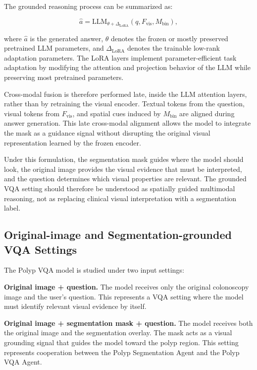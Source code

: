 The grounded reasoning process can be summarized as:

\begin{equation}
\hat{a} = \mathrm{LLM}_{\theta + \Delta_{\mathrm{LoRA}}}
\left(q, F_{\mathrm{vis}}, M_{\mathrm{bin}}\right),
\end{equation}

where $\hat{a}$ is the generated answer, $\theta$ denotes the frozen or mostly preserved pretrained LLM parameters, and $\Delta_{\mathrm{LoRA}}$ denotes the trainable low-rank adaptation parameters. The LoRA layers implement parameter-efficient task adaptation by modifying the attention and projection behavior of the LLM while preserving most pretrained parameters.

Cross-modal fusion is therefore performed late, inside the LLM attention layers, rather than by retraining the visual encoder. Textual tokens from the question, visual tokens from $F_{\mathrm{vis}}$, and spatial cues induced by $M_{\mathrm{bin}}$ are aligned during answer generation. This late cross-modal alignment allows the model to integrate the mask as a guidance signal without disrupting the original visual representation learned by the frozen encoder.

Under this formulation, the segmentation mask guides where the model should look, the original image provides the visual evidence that must be interpreted, and the question determines which visual properties are relevant. The grounded VQA setting should therefore be understood as spatially guided multimodal reasoning, not as replacing clinical visual interpretation with a segmentation label.

\subsection{Original-image and Segmentation-grounded VQA Settings}

The Polyp VQA model is studied under two input settings:

\textbf{Original image + question.} The model receives only the original colonoscopy image and the user's question. This represents a VQA setting where the model must identify relevant visual evidence by itself.

\textbf{Original image + segmentation mask + question.} The model receives both the original image and the segmentation overlay. The mask acts as a visual grounding signal that guides the model toward the polyp region. This setting represents cooperation between the Polyp Segmentation Agent and the Polyp VQA Agent.


